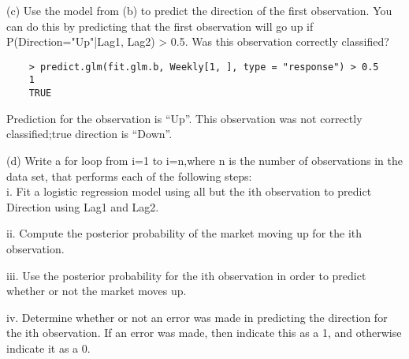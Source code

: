 \documentclass{article}
\begin{document}
(c) Use the model from (b) to predict the direction of the first observation. You can do this by predicting that the first observation will go up if P(Direction="Up"|Lag1, Lag2) > 0.5. Was this observation correctly classified?

\begin{program}
	\begin{verbatim}
	> predict.glm(fit.glm.b, Weekly[1, ], type = "response") > 0.5
	1 
	TRUE 
	\end{verbatim}
\end{program}

 Prediction for the observation is “Up”. This observation was not correctly classified;true direction is “Down”.


\newpage

(d) Write a for loop from i=1 to i=n,where n is the number of observations in the data set, that performs each of the following steps:\\

i. Fit a logistic regression model using all but the ith observation to predict Direction using Lag1 and Lag2.

ii. Compute the posterior probability of the market moving up for the ith observation.

iii. Use the posterior probability for the ith observation in order to predict whether or not the market moves up.

iv. Determine whether or not an error was made in predicting the direction for the ith observation. If an error was made, then indicate this as a 1, and otherwise indicate it as a 0.
\end{document}

